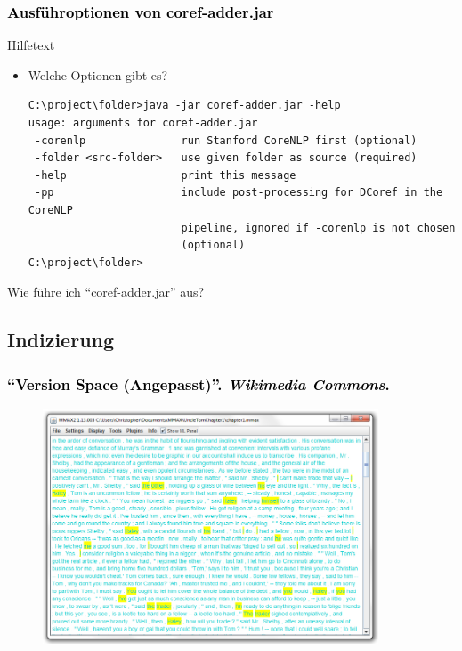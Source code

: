 \documentclass[xcolor=dvipsnames]{beamer}
\begin{document}

\begin{frame}[fragile]\frametitle{\textcolor{black}{Ausführoptionen von coref-adder.jar}}

\begin{block}{Hilfetext}
\begin{itemize}
\item Welche Optionen gibt es?
\begin{scriptsize}\begin{verbatim}
C:\project\folder>java -jar coref-adder.jar -help
usage: arguments for coref-adder.jar
 -corenlp               run Stanford CoreNLP first (optional)
 -folder <src-folder>   use given folder as source (required)
 -help                  print this message
 -pp                    include post-processing for DCoref in the CoreNLP
                        pipeline, ignored if -corenlp is not chosen
                        (optional)
C:\project\folder>
\end{verbatim}
\end{scriptsize}
\end{itemize}
\end{block}

\begin{block}{Wie führe ich ``coref-adder.jar'' aus?}
\end{block}

\end{frame}


\subsection{Indizierung}


\begin{frame}\frametitle{\textcolor{black}{``{Version Space (Angepasst)}''. \emph{Wikimedia Commons}.}}
\begin{figure}
\includegraphics[height=7cm]{cm_mmax.jpg}
\end{figure}

\end{frame}
\end{document}
